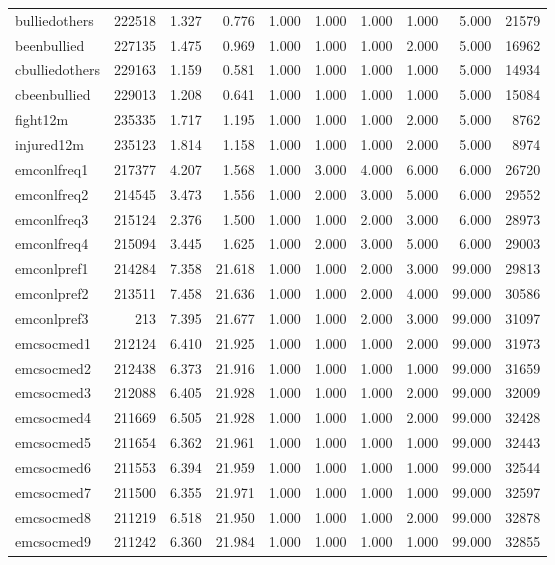 \documentclass[a4paper]{article}
\begin{document}
\begin{appendices}
\begin{table}[htbp]
{\begin{tabular}{lrrrrrrrrr}
bulliedothers & 222518 & 1.327& 0.776& 1.000& 1.000& 1.000& 1.000& 5.000& 21579 \\
beenbullied & 227135 & 1.475& 0.969& 1.000& 1.000& 1.000& 2.000& 5.000& 16962 \\
cbulliedothers & 229163 & 1.159& 0.581& 1.000& 1.000& 1.000& 1.000& 5.000& 14934 \\
cbeenbullied & 229013 & 1.208& 0.641& 1.000& 1.000& 1.000& 1.000& 5.000& 15084 \\
fight12m & 235335 & 1.717& 1.195& 1.000& 1.000& 1.000& 2.000& 5.000& 8762 \\
injured12m & 235123 & 1.814& 1.158& 1.000& 1.000& 1.000& 2.000& 5.000& 8974 \\
emconlfreq1 & 217377 & 4.207& 1.568& 1.000& 3.000& 4.000& 6.000& 6.000& 26720 \\
emconlfreq2 & 214545 & 3.473& 1.556& 1.000& 2.000& 3.000& 5.000& 6.000& 29552 \\
emconlfreq3 & 215124 & 2.376& 1.500& 1.000& 1.000& 2.000& 3.000& 6.000& 28973 \\
emconlfreq4 & 215094 & 3.445& 1.625& 1.000& 2.000& 3.000& 5.000& 6.000& 29003 \\
emconlpref1 & 214284 & 7.358& 21.618& 1.000& 1.000& 2.000& 3.000& 99.000& 29813 \\
emconlpref2 & 213511 & 7.458& 21.636& 1.000& 1.000& 2.000& 4.000& 99.000& 30586 \\
emconlpref3 & 213& 7.395& 21.677& 1.000& 1.000& 2.000& 3.000& 99.000& 31097 \\
emcsocmed1 & 212124 & 6.410& 21.925& 1.000& 1.000& 1.000& 2.000& 99.000& 31973 \\
emcsocmed2 & 212438 & 6.373& 21.916& 1.000& 1.000& 1.000& 1.000& 99.000& 31659 \\
emcsocmed3 & 212088 & 6.405& 21.928& 1.000& 1.000& 1.000& 2.000& 99.000& 32009 \\
emcsocmed4 & 211669 & 6.505& 21.928& 1.000& 1.000& 1.000& 2.000& 99.000& 32428 \\
emcsocmed5 & 211654 & 6.362& 21.961& 1.000& 1.000& 1.000& 1.000& 99.000& 32443 \\
emcsocmed6 & 211553 & 6.394& 21.959& 1.000& 1.000& 1.000& 1.000& 99.000& 32544 \\
emcsocmed7 & 211500 & 6.355& 21.971& 1.000& 1.000& 1.000& 1.000& 99.000& 32597 \\
emcsocmed8 & 211219 & 6.518& 21.950& 1.000& 1.000& 1.000& 2.000& 99.000& 32878 \\
emcsocmed9 & 211242 & 6.360& 21.984& 1.000& 1.000& 1.000& 1.000& 99.000& 32855 \\

\end{tabular}}
\end{table}
\end{appendices}
\end{document}
